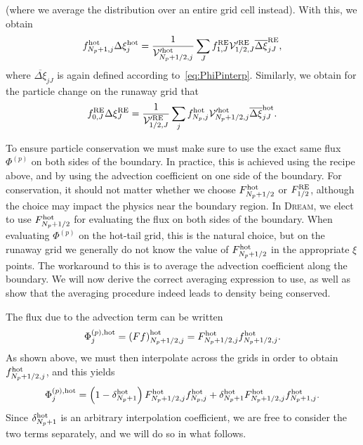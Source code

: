 \documentclass{notes}
\newcommand{\DREAM}{\textsc{Dream}}
\newcommand{\Vp}{\mathcal{V}'}
\begin{document}
    (where we average the distribution over an entire grid cell instead).
    With this, we obtain
    \begin{equation}\label{eq:fhotTransf}
        f^{\rm hot}_{N_p+1,j}\Delta\xi_j^{\rm hot} =
            \frac{1}{\Vp^{\rm hot}_{N_p+1/2,j}} \sum_J
                f_{1,J}^{\rm RE} \Vp^{\rm RE}_{1/2,J} \overline{\Delta\xi}_{jJ}^{\rm RE},
    \end{equation}
    where $\overline{\Delta\xi}_{jJ}$ is again defined according
    to~\eqref{eq:PhiPinterp}. Similarly, we obtain for the particle change on
    the runaway grid that
    \begin{equation}\label{eq:crossFlux_fRE0}
        f^{\rm RE}_{0,J}\Delta\xi_J^{\rm RE} =
            \frac{1}{\Vp^{\rm RE}_{1/2,J}} \sum_j
                f_{N_p,j}^{\rm hot} \Vp^{\rm hot}_{N_p+1/2,j} \overline{\Delta\xi}_{jJ}^{\rm hot}.
    \end{equation}

    To ensure particle conservation we must make sure to use the exact same flux
    $\Phi^{(p)}$ on both sides of the boundary. In practice, this is achieved
    using the recipe above, and by using the advection coefficient on one side
    of the boundary. For conservation, it should not matter whether we choose
    $F_{N_p+1/2}^{\rm hot}$ or $F_{1/2}^{\rm RE}$, although the choice may
    impact the physics near the boundary region. In \DREAM, we elect to use
    $F_{N_p+1/2}^{\rm hot}$ for evaluating the flux on both sides of the
    boundary. When evaluating $\Phi^{(p)}$ on the hot-tail grid, this is the
    natural choice, but on the runaway grid we generally do not know the value
    of $F^{\rm hot}_{N_p+1/2}$ in the appropriate $\xi$ points. The workaround
    to this is to average the advection coefficient along the boundary. We will
    now derive the correct averaging expression to use, as well as show that
    the averaging procedure indeed leads to density being conserved.

    The flux due to the advection term can be written
    \begin{equation}
        \Phi_j^{(p),{\rm hot}} = \left( Ff \right)^{\rm hot}_{N_p+1/2,j} = F_{N_p+1/2,j}^{\rm hot} f^{\rm hot}_{N_p+1/2,j}.
    \end{equation}
    As shown above, we must then interpolate across the grids in order to obtain
    $f^{\rm hot}_{N_p+1/2,j}$, and this yields
    \begin{equation}\label{eq:PhiPhot}
        \Phi^{(p),{\rm hot}}_j =
            \left(1-\delta^{\rm hot}_{N_p+1}\right) F^{\rm hot}_{N_p+1/2,j} f_{N_p,j}^{\rm hot} +
            \delta^{\rm hot}_{N_p+1} F^{\rm hot}_{N_p+1/2,j} f_{N_p+1,j}^{\rm hot}.
    \end{equation}
    Since $\delta^{\rm hot}_{N_p+1}$ is an arbitrary interpolation coefficient,
    we are free to consider the two terms separately, and we will do so in what
    follows.
\end{document}
